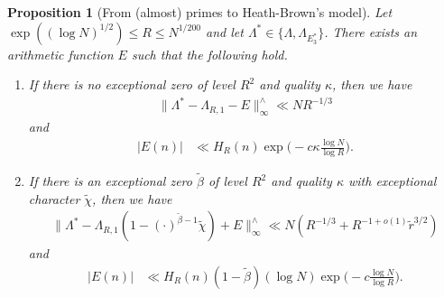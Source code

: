 \documentclass[12pt]{amsart}
\newtheorem{proposition}[theorem]{Proposition}
\theoremstyle{definition}
\theoremstyle{remark}
\numberwithin{equation}{section}
\newcommand{\1}{\mathbf{1}}
\begin{document}
\begin{proposition}[From (almost) primes to Heath-Brown's model]\label{prop:LLR}
    Let $\exp((\log N)^{1/2})\leq R \leq N^{1/200}$ and let $\Lambda^*\in\{\Lambda, \Lambda_{E_3^*}\}$. There exists an arithmetic function $E$  such that the following hold.
	\begin{enumerate}
	   \item If there is no exceptional zero of level $R^2$ and quality $\kappa$, then we have
		\begin{align}\label{eq:LLR1}
		  \|\Lambda^{*}-\Lambda_{R,1}-E\|_{\infty}^{\wedge}\ll N R^{-1/3}
		\end{align}
	    and
	   \begin{align}
             \label{eq:LLR101} |E(n)|&\ll H_R(n)\exp\bigl( -c \kappa \frac{\log N}{\log R} \bigr).
	   \end{align}
		\item If there is an exceptional zero $\widetilde{\beta}$ of level $R^2$ and quality $\kappa$ with exceptional character $\widetilde{\chi}$, then we have
			\begin{align}\label{eq:LLRfouerror}
				\|\Lambda^{*}-\Lambda_{R,1}(1-(\cdot)^{\widetilde{\beta}-1}\widetilde{\chi})+E\|_{\infty}^{\wedge}\ll N (R^{-1/3}+ R^{-1+o(1)}\widetilde{r}^{3/2})
			\end{align}
             and
	       \begin{align}	\label{eq:LLRexcerror}
              |E(n)|&\ll H_R(n) (1-\widetilde{\beta})(\log N)\exp\bigl(-c\frac{\log N}{\log R}\bigr).
			\end{align}
	\end{enumerate}
    
\end{proposition}
\end{document}
